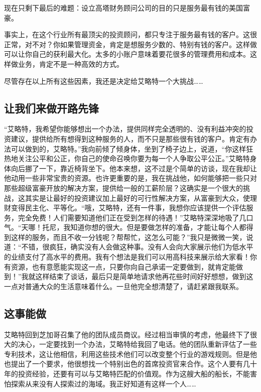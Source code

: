 现在只剩下最后的难题：设立高塔财务顾问公司的目的只是服务最有钱的美国富豪。

事实上，在这个行业所有最顶尖的投资顾问，都只专注于服务最有钱的客户。这很正常，对不对？你如果管理资金，肯定是想服务少数的、特别有钱的客户。这样做可以让你自己的获利最大化。太多的小账户意味着要花很多的管理费用和成本。这样做业务，肯定不是一种高效的方式。

尽管存在以上所有这些因素，我还是决定给艾略特一个大挑战……

\subsection{让我们来做开路先锋}

“艾略特，我希望你能够想出一个办法，提供同样完全透明的、没有利益冲突的投资建议，提供给所有想得到这种服务的人，而不只是那些很有钱的客户。肯定有办法可以做到的，艾略特。”我向前倾了倾身体，坐到了椅子边上，说道，“你这样狂热地关注公平和公正，你自己的使命召唤你要为每一个人争取公平公正。”艾略特身体向后挪了一下，靠近椅背坐下。他本来想，这不过是个简单的访谈，现在我却让他动用一些非常宝贵的资源。也许更重要的是，我在挑战他，如何能够把一些只对那些超级富豪开放的解决方案，提供给一般的工薪阶层？这确实是一个很大的挑战，这其实是让最好的投资建议加上最好的可行性解决方案，从富豪到大众，使理财变得民主化、平等化。“哦，艾略特，还有一件事，我想你应该提供一个评估服务，完全免费！人们需要知道他们正在受到怎样的待遇！”艾略特深深地吸了几口气。“天哪！托尼，我知道你想的很大。但是要做怎样的准备，才能让每个人都得到这样的服务，而且不收一分钱呢？帮帮忙，这怎么可能？”我只是微微一笑，说道：“不错，很疯狂，确实没有人会做这种事。没有人会向大家展示他们为低水平的业绩支付了高水平的费用。我有个想法是我们可以用高科技来展示给大家看！你有资源，也有意愿能实现这一点，只要你向自己承诺一定要做到，就肯定能做到！”我就这样结束了谈话，最后只是简单地请求他再花些时间好好想想，做到这一点对普通大众的生活意味着什么。一旦他完全想清楚了，请赶紧跟我联系。

\subsection{这事能做}

艾略特回到芝加哥召集了他的团队成员商议。经过相当审慎的考虑，他最终下了很大的决心，一定要找到一个办法，艾略特给我回了电话。他的团队重新评估了一些专利技术，这让他相信，利用这些技术他们可以改变整个行业的游戏规则。但是他也提出了一个要求，他很想找一个特别出色的首席投资官来合作。这个人要有几十年的投资经验，还要有可以与艾略特匹配的价值观。作为这艘大船的船长，不能害怕探索从来没有人探索过的海域。我正好知道有这样一个人……

